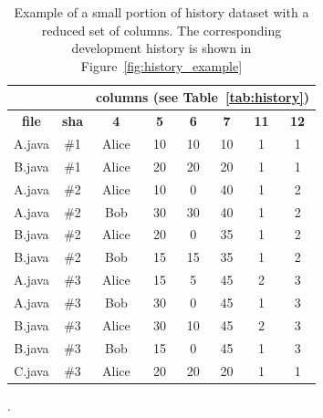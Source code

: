 \begin{table}[ht]
\centering
\footnotesize
\begin{tabular}{|c|c|c|c|c|c|c|c|}
\cline{3-8}
\multicolumn{1}{c}{} & 
\multicolumn{1}{c}{} & \multicolumn{6}{|c|}{\textbf{columns (see Table~\ref{tab:history})}} \\
\hline
\textbf{file} & \textbf{sha} & \textbf{4} & \textbf{5} & \textbf{6} & \textbf{7} & \textbf{11} & \textbf{12}
\\
\hline
A.java & \#1 & Alice  & 10                        & 10                                & 10               & 1                     & 1                  \\
B.java & \#1 & Alice  & 20                        & 20                                & 20               & 1                     & 1                  \\
A.java & \#2 & Alice  & 10                        & 0                                 & 40               & 1                     & 2                  \\
A.java & \#2 & Bob    & 30                        & 30                                & 40               & 1                     & 2                  \\
B.java & \#2 & Alice  & 20                        & 0                                 & 35               & 1                     & 2                  \\
B.java & \#2 & Bob    & 15                        & 15                                & 35               & 1                     & 2                  \\
A.java & \#3 & Alice  & 15                        & 5                                 & 45               & 2                     & 3                  \\
A.java & \#3 & Bob    & 30                        & 0                                 & 45               & 1                     & 3                  \\
B.java & \#3 & Alice  & 30                        & 10                                & 45               & 2                     & 3                  \\
B.java & \#3 & Bob    & 15                        & 0                                 & 45               & 1                     & 3                  \\
C.java & \#3 & Alice  & 20                        & 20                                & 20               & 1                     & 1 \\\hline
\end{tabular}
\caption{Example of a small portion of history dataset with a reduced set of columns. The corresponding development history is shown in Figure~\ref{fig:history_example}}.
\label{tab:history_example}
\end{table}

